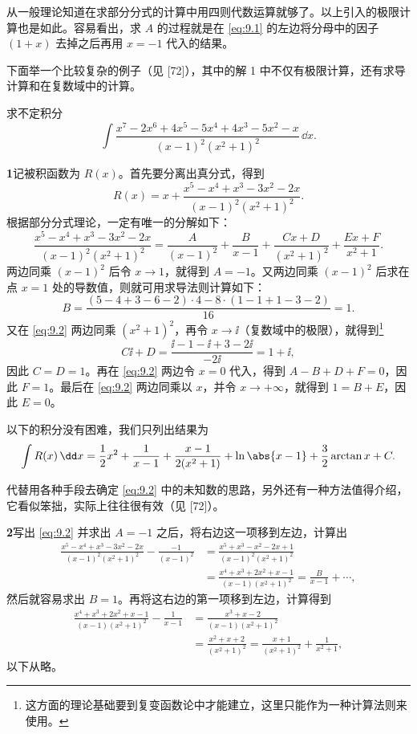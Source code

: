 \begin{xremark}
从一般理论知道在求部分分式的计算中用四则代数运算就够了。以上引入的极限计算也是如此。容易看出，求 $A$ 的过程就是在 \eqref{eq:9.1} 的左边将分母中的因子 $(1+x)$ 去掉之后再用 $x=-1$ 代入的结果。
\end{xremark}

下面举一个比较复杂的例子（见 [72]），其中的解 1 中不仅有极限计算，还有求导计算和在复数域中的计算。

\begin{xexample}[9.2.2]
求不定积分
\[
  \int\frac{x^7-2x^6+4x^5-5x^4+4x^3-5x^2-x}{(x-1)^2(x^2+1)^2}\,\dd x.
\]
\end{xexample}

\begin{xsolution}
\textbf{1}\quad 记被积函数为 $R(x)$。首先要分离出真分式，得到
\[
  R(x)=x+\frac{x^5-x^4+x^3-3x^2-2x}{(x-1)^2(x^2+1)^2}.
\]
根据部分分式理论，一定有唯一的分解如下：
\begin{equation}
  \frac{x^5-x^4+x^3-3x^2-2x}{(x-1)^2(x^2+1)^2}
  =\frac{A}{(x-1)^2}+\frac{B}{x-1}
   +\frac{Cx+D}{(x^2+1)^2}+\frac{Ex+F}{x^2+1}.
  \tag{9.2}
  \label{eq:9.2}
\end{equation}
两边同乘 $(x-1)^2$ 后令 $x\to1$，就得到 $A=-1$。又两边同乘 $(x-1)^2$ 后求在点 $x=1$ 处的导数值，则就可用求导法则计算如下：
\[
  B=\frac{(5-4+3-6-2)\cdot4-8\cdot(1-1+1-3-2)}{16}=1.
\]
又在 \eqref{eq:9.2} 两边同乘 $(x^2+1)^2$，再令 $x\to\ii$（复数域中的极限），就得到\footnote{这方面的理论基础要到复变函数论中才能建立，这里只能作为一种计算法则来使用。}
\[
  C\ii+D=\frac{\ii-1-\ii+3-2\ii}{-2\ii}=1+\ii,
\]
因此 $C=D=1$。再在 \eqref{eq:9.2} 两边令 $x=0$ 代入，得到 $A-B+D+F=0$，因此 $F=1$。最后在 \eqref{eq:9.2} 两边同乘以 $x$，并令 $x\to+\infty$，就得到 $1=B+E$，因此 $E=0$。

以下的积分没有困难，我们只列出结果为
\[
  \int R(x)\,\dd x
  =\frac12x^2+\frac1{x-1}+\frac{x-1}{2(x^2+1)}+\ln\abs{x-1}+\frac32\arctan x+C.
\]

代替用各种手段去确定 \eqref{eq:9.2} 中的未知数的思路，另外还有一种方法值得介绍，它看似笨拙，实际上往往很有效（见 [72]）。
\end{xsolution}

\begin{xsolution}
\textbf{2}\quad 写出 \eqref{eq:9.2} 并求出 $A=-1$ 之后，将右边这一项移到左边，计算出
\begin{align*}
  \frac{x^5-x^4+x^3-3x^2-2x}{(x-1)^2(x^2+1)^2}-\frac{-1}{(x-1)^2}
  &=\frac{x^5+x^3-x^2-2x+1}{(x-1)^2(x^2+1)^2}\\
  &=\frac{x^4+x^3+2x^2+x-1}{(x-1)(x^2+1)^2}
   =\frac{B}{x-1}+\cdots,
\end{align*}
然后就容易求出 $B=1$。再将这右边的第一项移到左边，计算得到
\begin{align*}
  \frac{x^4+x^3+2x^2+x-1}{(x-1)(x^2+1)^2}-\frac1{x-1}
  &=\frac{x^3+x-2}{(x-1)(x^2+1)^2}\\
  &=\frac{x^2+x+2}{(x^2+1)^2}
   =\frac{x+1}{(x^2+1)^2}+\frac1{x^2+1},
\end{align*}
以下从略。
\end{xsolution}

